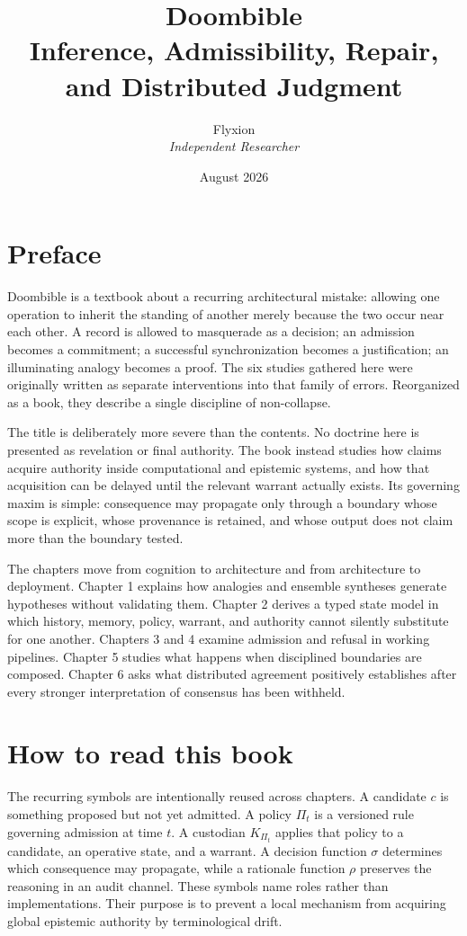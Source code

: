\documentclass[11pt,openany]{book}
\title{\textbf{Doombible}\\[0.5em]\large Inference, Admissibility, Repair, and Distributed Judgment}
\author{Flyxion\\\textit{Independent Researcher}}
\date{August 2026}
\begin{document}
\frontmatter
\maketitle
\chapter*{Preface}
Doombible is a textbook about a recurring architectural mistake: allowing one operation to inherit the standing of another merely because the two occur near each other. A record is allowed to masquerade as a decision; an admission becomes a commitment; a successful synchronization becomes a justification; an illuminating analogy becomes a proof. The six studies gathered here were originally written as separate interventions into that family of errors. Reorganized as a book, they describe a single discipline of non-collapse.

The title is deliberately more severe than the contents. No doctrine here is presented as revelation or final authority. The book instead studies how claims acquire authority inside computational and epistemic systems, and how that acquisition can be delayed until the relevant warrant actually exists. Its governing maxim is simple: consequence may propagate only through a boundary whose scope is explicit, whose provenance is retained, and whose output does not claim more than the boundary tested.

The chapters move from cognition to architecture and from architecture to deployment. Chapter 1 explains how analogies and ensemble syntheses generate hypotheses without validating them. Chapter 2 derives a typed state model in which history, memory, policy, warrant, and authority cannot silently substitute for one another. Chapters 3 and 4 examine admission and refusal in working pipelines. Chapter 5 studies what happens when disciplined boundaries are composed. Chapter 6 asks what distributed agreement positively establishes after every stronger interpretation of consensus has been withheld.

\chapter*{How to read this book}
The recurring symbols are intentionally reused across chapters. A candidate $c$ is something proposed but not yet admitted. A policy $\Pi_t$ is a versioned rule governing admission at time $t$. A custodian $K_{\Pi_t}$ applies that policy to a candidate, an operative state, and a warrant. A decision function $\sigma$ determines which consequence may propagate, while a rationale function $\rho$ preserves the reasoning in an audit channel. These symbols name roles rather than implementations. Their purpose is to prevent a local mechanism from acquiring global epistemic authority by terminological drift.
\end{document}

